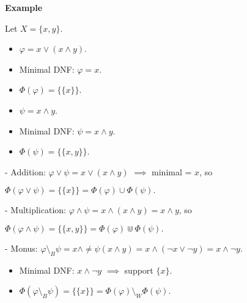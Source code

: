 \textbf{Example}

Let \(X=\{x,y\}\).
\begin{itemize}
    \item \(\varphi = x \vee (x\wedge y)\).  
    \item Minimal DNF: \(\varphi = x\).
    \item \(\Phi(\varphi) = \{\{x\}\}\).
    \item \(\psi = x\wedge y\).  
    \item Minimal DNF: \(\psi = x\wedge y\).
    \item \(\Phi(\psi) = \{\{x,y\}\}\).
\end{itemize}

- Addition:  
  \(\varphi \vee \psi = x \vee (x\wedge y)\) $\implies$ minimal = \(x\), so

  \(\Phi(\varphi\vee\psi) = \{\{x\}\} = \Phi(\varphi)\cup\Phi(\psi).\)

- Multiplication:  
  \(\varphi \wedge \psi = x\wedge(x\wedge y) = x\wedge y\), so

  \(\Phi(\varphi\wedge\psi) = \{\{x,y\}\} = \Phi(\varphi)\Cup\Phi(\psi).\)

- Monus:  
  \(\varphi\setminus_B\psi = x\wedge\ne\psi(x\wedge y) = x\wedge(\neg x\vee\neg y) = x\wedge\neg y\).
\begin{itemize}
    \item Minimal DNF: \(x\wedge\neg y\) $\implies$ support \(\{x\}\).
    \item \(\Phi(\varphi\setminus_B\psi) = \{\{x\}\} = \Phi(\varphi)\setminus_W\Phi(\psi).\)
\end{itemize}